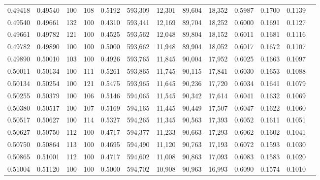 \begin{tabular}{rrrrrrrrrrrrr}
0.49418 & 0.49540 &   100 & 108 &                                     0.5192 & 593,309 &  12,301 &  89,604 &  18,352 & 0.5987 & 0.1700 & 0.1139 \\
0.49540 & 0.49661 &   132 & 100 &                                     0.4310 & 593,441 &  12,169 &  89,704 &  18,252 & 0.6000 & 0.1691 & 0.1127 \\
0.49661 & 0.49782 &   121 & 100 &                                     0.4525 & 593,562 &  12,048 &  89,804 &  18,152 & 0.6011 & 0.1681 & 0.1116 \\
0.49782 & 0.49890 &   100 & 100 &                                     0.5000 & 593,662 &  11,948 &  89,904 &  18,052 & 0.6017 & 0.1672 & 0.1107 \\
0.49890 & 0.50010 &   103 & 100 &                                     0.4926 & 593,765 &  11,845 &  90,004 &  17,952 & 0.6025 & 0.1663 & 0.1097 \\
0.50011 & 0.50134 &   100 & 111 &                                     0.5261 & 593,865 &  11,745 &  90,115 &  17,841 & 0.6030 & 0.1653 & 0.1088 \\
0.50134 & 0.50254 &   100 & 121 &                                     0.5475 & 593,965 &  11,645 &  90,236 &  17,720 & 0.6034 & 0.1641 & 0.1079 \\
0.50255 & 0.50379 &   100 & 106 &                                     0.5146 & 594,065 &  11,545 &  90,342 &  17,614 & 0.6041 & 0.1632 & 0.1069 \\
0.50380 & 0.50517 &   100 & 107 &                                     0.5169 & 594,165 &  11,445 &  90,449 &  17,507 & 0.6047 & 0.1622 & 0.1060 \\
0.50517 & 0.50627 &   100 & 114 &                                     0.5327 & 594,265 &  11,345 &  90,563 &  17,393 & 0.6052 & 0.1611 & 0.1051 \\
0.50627 & 0.50750 &   112 & 100 &                                     0.4717 & 594,377 &  11,233 &  90,663 &  17,293 & 0.6062 & 0.1602 & 0.1041 \\
0.50750 & 0.50864 &   113 & 100 &                                     0.4695 & 594,490 &  11,120 &  90,763 &  17,193 & 0.6072 & 0.1593 & 0.1030 \\
0.50865 & 0.51001 &   112 & 100 &                                     0.4717 & 594,602 &  11,008 &  90,863 &  17,093 & 0.6083 & 0.1583 & 0.1020 \\
0.51004 & 0.51120 &   100 & 100 &                                     0.5000 & 594,702 &  10,908 &  90,963 &  16,993 & 0.6090 & 0.1574 & 0.1010 \\

\end{tabular}
